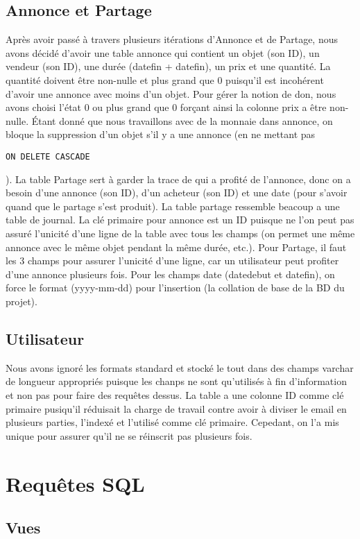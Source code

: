 \documentclass[a4paper,12pt]{article}
\begin{document}
\begin{spacing}{1}
	\subsection*{Annonce et Partage}
	Après avoir passé à travers plusieurs itérations d'Annonce et de Partage, nous avons décidé d'avoir une table annonce qui contient un objet (son ID), un vendeur (son ID), une  durée (datefin + datefin), un prix et une quantité. La quantité doivent être non-nulle et plus grand que 0 puisqu'il est incohérent d'avoir une annonce avec moins d'un objet. Pour gérer la notion de don, nous avons choisi l'état 0 ou plus grand que 0 forçant ainsi la colonne prix a être non-nulle. Étant donné que nous travaillons avec de la monnaie dans annonce, on bloque la suppression d'un objet s'il y a une annonce (en ne mettant pas \begin{verbatim}ON DELETE CASCADE\end{verbatim}). La table Partage sert à garder la trace de qui a profité de l'annonce, donc on a besoin d'une annonce (son ID), d'un acheteur (son ID) et une date (pour s'avoir quand que le partage s'est produit). La table partage ressemble beacoup a une table de journal. La clé primaire pour annonce est un ID puisque ne l'on peut pas assuré l'unicité d'une ligne de la table avec tous les champs (on permet une même annonce avec le même objet pendant la même durée, etc.). Pour Partage, il faut les 3 champs pour assurer l'unicité d'une ligne, car un utilisateur peut profiter d'une annonce plusieurs fois. Pour les champs date (datedebut et datefin), on force le format (yyyy-mm-dd) pour l'insertion (la collation de base de la BD du projet).
	\subsection*{Utilisateur}
	Nous avons ignoré les formats standard et stocké le tout dans des champs varchar de longueur appropriés puisque les chanps ne sont qu'utilisés à fin d'information et non pas pour faire des requêtes dessus. La table a une colonne ID comme clé primaire pusiqu'il réduisait la charge de travail contre avoir à diviser le email en plusieurs parties, l'indexé et l'utilisé comme clé primaire. Cepedant, on l'a mis unique pour assurer qu'il ne se réinscrit pas plusieurs fois.
	\section*{Requêtes SQL}
	\subsection*{Vues}
	

\end{spacing}
\end{document}
